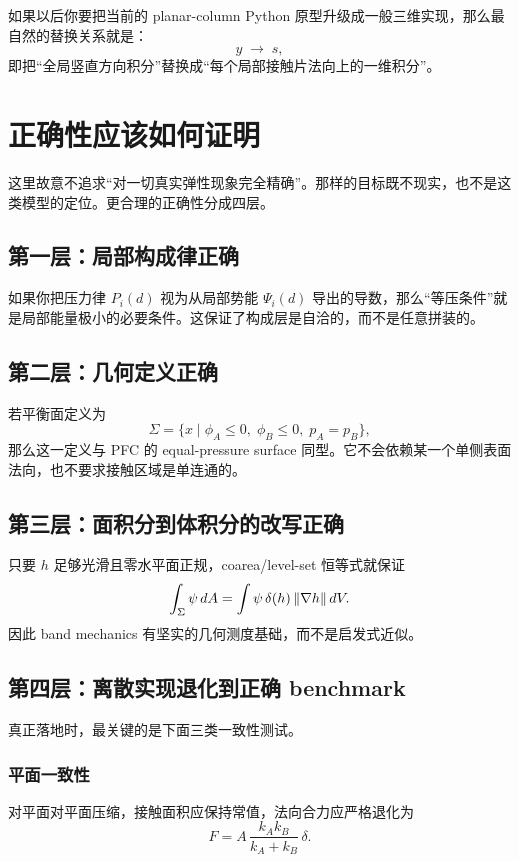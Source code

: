 \documentclass[12pt,a4paper]{ctexart}
\begin{document}
如果以后你要把当前的 planar-column Python 原型升级成一般三维实现，那么最自然的替换关系就是：
\begin{equation}
    y \;\longrightarrow\; s,
\end{equation}
即把“全局竖直方向积分”替换成“每个局部接触片法向上的一维积分”。


\section{正确性应该如何证明}

这里故意不追求“对一切真实弹性现象完全精确”。那样的目标既不现实，也不是这类模型的定位。更合理的正确性分成四层。

\subsection{第一层：局部构成律正确}
如果你把压力律 $P_i(d)$ 视为从局部势能 $\Psi_i(d)$ 导出的导数，那么“等压条件”就是局部能量极小的必要条件。这保证了构成层是自洽的，而不是任意拼装的。

\subsection{第二层：几何定义正确}
若平衡面定义为
\begin{equation}
    \Sigma=\{x\mid \phi_A\le 0,\;\phi_B\le 0,\;p_A=p_B\},
\end{equation}
那么这一定义与 PFC 的 equal-pressure surface 同型。它不会依赖某一个单侧表面法向，也不要求接触区域是单连通的。

\subsection{第三层：面积分到体积分的改写正确}
只要 $h$ 足够光滑且零水平面正规，coarea/level-set 恒等式就保证
\begin{equation}
    \int_{\Sigma}\psi\,dA
    =
    \int \psi\,\delta(h)\,\norm{\nabla h}\,dV.
\end{equation}
因此 band mechanics 有坚实的几何测度基础，而不是启发式近似。

\subsection{第四层：离散实现退化到正确 benchmark}
真正落地时，最关键的是下面三类一致性测试。

\subsubsection{平面一致性}
对平面对平面压缩，接触面积应保持常值，法向合力应严格退化为
\begin{equation}
    F = A\,\frac{k_Ak_B}{k_A+k_B}\,\delta.
\end{equation}
\end{document}
